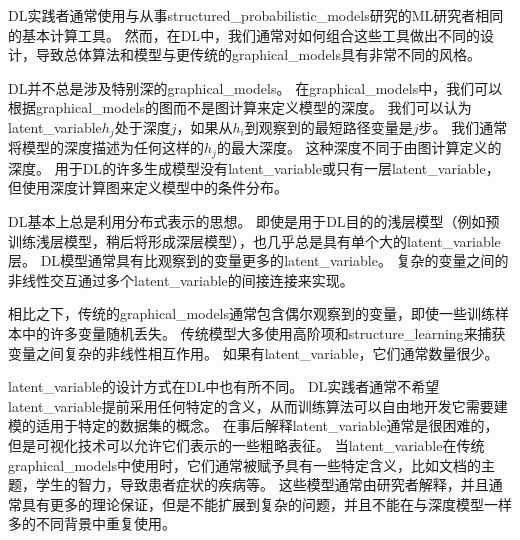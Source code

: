 \gls{DL}实践者通常使用与从事\gls{structured_probabilistic_models}研究的\gls{ML}研究者相同的基本计算工具。
然而，在\gls{DL}中，我们通常对如何组合这些工具做出不同的设计，导致总体算法和模型与更传统的\gls{graphical_models}具有非常不同的风格。


\gls{DL}并不总是涉及特别深的\gls{graphical_models}。
在\gls{graphical_models}中，我们可以根据\gls{graphical_models}的图而不是图计算来定义模型的深度。
我们可以认为\gls{latent_variable}$h_j$处于深度$j$，如果从$h_i$到观察到的最短路径变量是$j$步。
我们通常将模型的深度描述为任何这样的$h_j$的最大深度。 
这种深度不同于由图计算定义的深度。
用于\gls{DL}的许多生成模型没有\gls{latent_variable}或只有一层\gls{latent_variable}，但使用深度计算图来定义模型中的条件分布。


\gls{DL}基本上总是利用分布式表示的思想。
即使是用于\gls{DL}目的的浅层模型（例如预训练浅层模型，稍后将形成深层模型），也几乎总是具有单个大的\gls{latent_variable}层。
\gls{DL}模型通常具有比观察到的变量更多的\gls{latent_variable}。
复杂的变量之间的非线性交互通过多个\gls{latent_variable}的间接连接来实现。


相比之下，传统的\gls{graphical_models}通常包含偶尔观察到的变量，即使一些训练样本中的许多变量随机丢失。
传统模型大多使用高阶项和\gls{structure_learning}来捕获变量之间复杂的非线性相互作用。
如果有\gls{latent_variable}，它们通常数量很少。



\gls{latent_variable}的设计方式在\gls{DL}中也有所不同。
\gls{DL}实践者通常不希望\gls{latent_variable}提前采用任何特定的含义，从而训练算法可以自由地开发它需要建模的适用于特定的数据集的概念。
在事后解释\gls{latent_variable}通常是很困难的，但是可视化技术可以允许它们表示的一些粗略表征。
当\gls{latent_variable}在传统\gls{graphical_models}中使用时，它们通常被赋予具有一些特定含义，比如文档的主题，学生的智力，导致患者症状的疾病等。
这些模型通常由研究者解释，并且通常具有更多的理论保证，但是不能扩展到复杂的问题，并且不能在与深度模型一样多的不同背景中重复使用。


